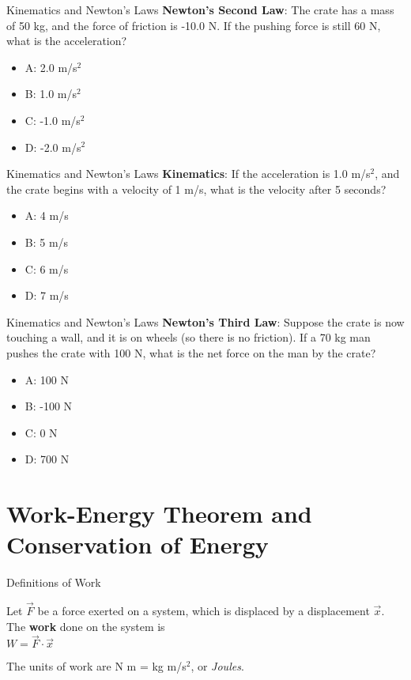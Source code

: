 \documentclass{beamer}
\begin{document}
\begin{frame}{Kinematics and Newton's Laws}
\textbf{Newton's Second Law}: The crate has a mass of 50 kg, and the force of friction is -10.0 N.  If the pushing force is still 60 N, what is the acceleration?
\begin{itemize}
\item A: 2.0 m/s$^2$
\item B: 1.0 m/s$^2$
\item C: -1.0 m/s$^2$
\item D: -2.0 m/s$^2$
\end{itemize}
\end{frame}

\begin{frame}{Kinematics and Newton's Laws}
\textbf{Kinematics}: If the acceleration is 1.0 m/s$^2$, and the crate begins with a velocity of 1 m/s, what is the velocity after 5 seconds?
\begin{itemize}
\item A: 4 m/s
\item B: 5 m/s
\item C: 6 m/s
\item D: 7 m/s
\end{itemize}
\end{frame}

\begin{frame}{Kinematics and Newton's Laws}
\textbf{Newton's Third Law}: Suppose the crate is now touching a wall, and it is on wheels (so there is no friction).  If a 70 kg man pushes the crate with 100 N, what is the net force on the man by the crate?
\begin{itemize}
\item A: 100 N
\item B: -100 N
\item C: 0 N
\item D: 700 N
\end{itemize}
\end{frame}

\section{Work-Energy Theorem and Conservation of Energy}

\begin{frame}{Definitions of Work}
\begin{tcolorbox}[colback=white,colframe=red!40!blue,title=Physical Definition of Work]
\alert{Let $\vec{F}$ be a force exerted on a system, which is displaced by a displacement $\vec{x}$.  The \textbf{work} done on the system is} \\
\alert{$W = \vec{F} \cdot \vec{x}$} \\
\end{tcolorbox}
The units of work are N m = kg m/s$^2$, or \textit{Joules}. \\
\end{frame}
\end{document}
